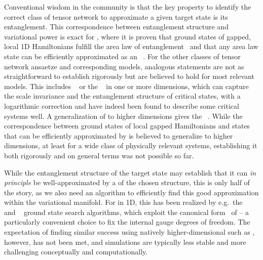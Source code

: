 Conventional wisdom in the community is that the key property to identify the correct class of tensor network to approximate a given target state is its entanglement.
%
This correspondence between entanglement structure and variational power is exact for , where it is proven that ground states of gapped, local 1D Hamiltonians fulfill the area law of entanglement~\cite{hastings2007a} and that any area law state can be efficiently approximated as an ~\cite{schuch2008, gottesman2010}.
%
For the other classes of tensor network ansaetze and corresponding models, analogous statements are not as straightforward to establish rigorously but are believed to hold for most relevant models.
%
This includes ~\cite{fannes1992b, shi2006, murg2010} or the ~\cite{vidal2007a, vidal2008, evenbly2009} in one or more dimensions, which can capture the scale invariance and the entanglement structure of critical states, with a logarithmic correction and have indeed been found to describe some critical systems well.
%
A generalization of  to higher dimensions gives the ~\cite{nishio2004, verstraete2004}.
%
While the correspondence between ground states of local gapped Hamiltonians and states that can be efficiently approximated by  is believed to generalize to higher dimensions, at least for a wide class of physically relevant systems, establishing it both rigorously and on general terms was not possible so far.



While the entanglement structure of the target state may establish that it can \emph{in principle} be well-approximated by a  of the chosen structure, this is only half of the story, as we also need an algorithm to efficiently find this good approximation within the variational manifold.
%
For  in 1D, this has been realized by e.g.~the ~\cite{dukelsky1998, schollwock2011} and ~\cite{zauner-stauber2018a} ground state search algorithms, which exploit the canonical form~\cite{haegeman2013, vanderstraeten2019a} of  -- a particularly convenient choice to fix the internal gauge degrees of freedom.
%
The expectation of finding similar success using natively higher-dimensional  such as , however, has not been met, and  simulations are typically less stable and more challenging conceptually and computationally.



